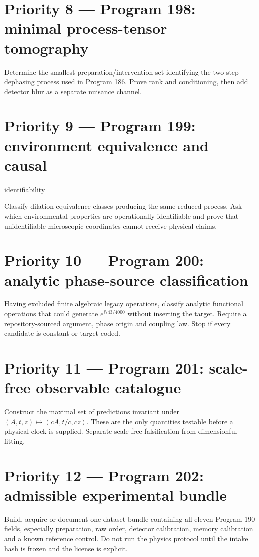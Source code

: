 \documentclass[11pt,a4paper,openany]{report}
\begin{document}
\section{Priority 8 --- Program 198: minimal process-tensor tomography}

Determine the smallest preparation/\allowbreak{}intervention set identifying the two-step dephasing process used in Program 186. Prove rank and conditioning, then add detector blur as a separate nuisance channel.

\section{Priority 9 --- Program 199: environment equivalence and causal}

identifiability

Classify dilation equivalence classes producing the same reduced process. Ask which environmental properties are operationally identifiable and prove that unidentifiable microscopic coordinates cannot receive physical claims.

\section{Priority 10 --- Program 200: analytic phase-source classification}

Having excluded finite algebraic legacy operations, classify analytic functional operations that could generate \(e^{i743/4000}\) without inserting the target. Require a repository-sourced argument, phase origin and coupling law. Stop if every candidate is constant or target-coded.

\section{Priority 11 --- Program 201: scale-free observable catalogue}

Construct the maximal set of predictions invariant under \((A,t,z)\mapsto(cA,t/c,cz)\). These are the only quantities testable before a physical clock is supplied. Separate scale-free falsification from dimensionful fitting.

\section{Priority 12 --- Program 202: admissible experimental bundle}

Build, acquire or document one dataset bundle containing all eleven Program-190 fields, especially preparation, raw order, detector calibration, memory calibration and a known reference control. Do not run the physics protocol until the intake hash is frozen and the license is explicit.
\end{document}

